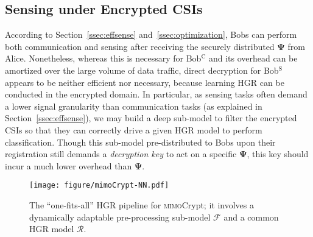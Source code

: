 \documentclass[conference,compsoc]{IEEEtran}
\newcommand{\sname}{\textsc{mimo}Crypt\xspace}
\newcommand{\rev}[1]{{\color{blue}#1}}      %
\newcommand{\newrev}[1]{{\color{blue}#1}}    %
\newcommand{\rev}[1]{#1}
\newcommand{\newrev}[1]{#1}
\begin{document}
\subsection{Sensing under Encrypted CSIs} \label{sec:ssCSI}
\vspace{-1ex}
%
According to Section~\ref{ssec:effsense} and~\ref{ssec:optimization}, Bobs can perform both communication and sensing after receiving the securely distributed $\bm{\Psi}$ from Alice. Nonetheless, whereas this is necessary for Bob$^{\mathrm{C}}$ and its overhead can be amortized over the large volume of data traffic, \newrev{direct decryption for Bob$^{\mathrm{S}}$ appears to be neither efficient nor necessary, because learning HGR can be conducted in the encrypted domain. 
In particular, as} sensing tasks often demand a lower signal granularity
than communication tasks (as explained in Section~\ref{ssec:effsense}), we may build a deep sub-model to filter the encrypted CSIs so that they can correctly drive a given HGR model to perform classification. Though this sub-model pre-distributed to Bobs upon their registration still demands a \textit{decryption key} to act on a specific $\bm{\Psi}$, this key should incur a much lower overhead than $\bm{\Psi}$.


\begin{figure}[b]
	\setlength\abovecaptionskip{8pt}
	\vspace{-1ex}
	\centering
	\texttt{[image: figure/mimoCrypt-NN.pdf]}
	\caption{The ``one-fits-all'' HGR pipeline for \sname; it involves a dynamically adaptable pre-processing sub-model $\mathcal{F}$ and a common HGR model $\mathcal{R}$.}
	\label{fig:ill_HGRmodel}
	\vspace{-.5ex}
\end{figure}
\end{document}
